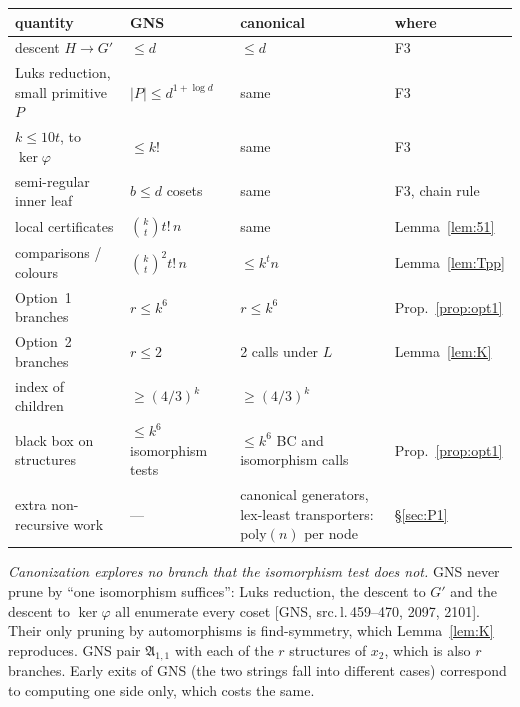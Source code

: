 \documentclass[11pt]{article}
\theoremstyle{plain}
\theoremstyle{definition}
\theoremstyle{remark}
\theoremstyle{named}
\theoremstyle{namedrm}
\newcommand{\fA}{\mathfrak{A}}
\newcommand{\src}[2]{[#1, src.\,l.\,#2]}
\begin{document}
\begin{center}\small
\begin{tabularx}{\linewidth}{@{}L{4.1cm}L{3.2cm}YL{2.3cm}@{}}
\toprule
quantity & GNS & canonical & where\\
\midrule
descent $H\to G'$ & $\le d$ & $\le d$ & F3\\
Luks reduction, small primitive $P$ & $|P|\le d^{1+\log d}$ & same & F3\\
$k\le10t$, to $\ker\varphi$ & $\le k!$ & same & F3\\
semi-regular inner leaf & $b\le d$ cosets & same & F3, chain rule\\
local certificates & $\binom kt t!\,n$ & same & Lemma~\ref{lem:51}\\
comparisons / colours & $\binom kt^2t!\,n$ & $\le k^tn$ & Lemma~\ref{lem:Tpp}\\
Option~1 branches & $r\le k^6$ & $r\le k^6$ & Prop.~\ref{prop:opt1}\\
Option~2 branches & $r\le2$ & 2 calls under $L$ & Lemma~\ref{lem:K}\\
index of children & $\ge(4/3)^k$ & $\ge(4/3)^k$ & \cite[Cor.~6.5]{GNS}\\
black box on structures & $\le k^6$ isomorphism tests & $\le k^6$ BC and isomorphism calls & Prop.~\ref{prop:opt1}\\
extra non-recursive work & --- & canonical generators, lex-least transporters: poly$(n)$ per node & \S\ref{sec:P1}\\
\bottomrule
\end{tabularx}
\end{center}

\emph{Canonization explores no branch that the isomorphism test does not.} GNS never prune by ``one
isomorphism suffices'': Luks reduction, the descent to $G'$ and the descent to $\ker\varphi$ all enumerate
every coset \src{GNS}{459--470, 2097, 2101}. Their only pruning by automorphisms is find-symmetry, which
Lemma~\ref{lem:K} reproduces. GNS pair $\fA_{1,1}$ with each of the $r$ structures of $x_2$, which is also $r$
branches. Early exits of GNS (the two strings fall into different cases) correspond to computing one side
only, which costs the same.
\end{document}
